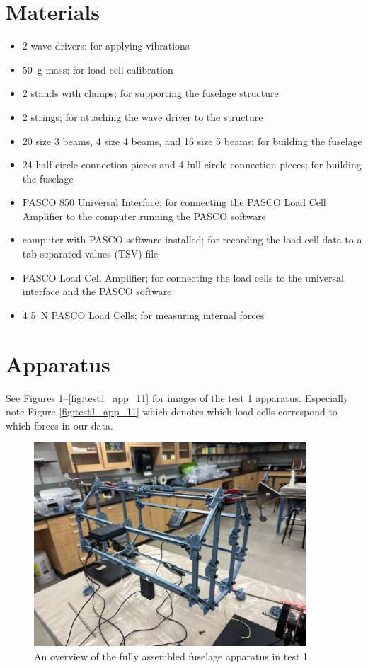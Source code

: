 \documentclass[12 pt]{report}
\begin{document}
\section{Materials} \label{materials}
\begin{itemize}
	\item \num{2} wave drivers; for applying vibrations
	\item \qty{50}{\gram} mass; for load cell calibration
	\item \num{2} stands with clamps; for supporting the fuselage structure
	\item \num{2} strings; for attaching the wave driver to the structure
	\item \num{20} size \num{3} beams, \num{4} size \num{4} beams, and \num{16} size \num{5} beams; for building the fuselage
	\item \num{24} half circle connection pieces and \num{4} full circle connection pieces; for building the fuselage
	\item PASCO 850 Universal Interface; for connecting the PASCO Load Cell Amplifier to the computer running the PASCO software
	\item computer with PASCO software installed; for recording the load cell data to a tab-separated values (TSV) file
	\item PASCO Load Cell Amplifier; for connecting the load cells to the universal interface and the PASCO software
	\item \num{4} \qty{5}{\newton} PASCO Load Cells; for measuring internal forces
\end{itemize}

\section{Apparatus} \label{apparatus}
See Figures \ref{fig:test1_app_1}--\ref{fig:test1_app_11} for images of the test \num{1} apparatus. Especially note Figure \ref{fig:test1_app_11} which denotes which load cells correspond to which forces in our data.

\begin{figure}[htbp]
	\centering
	\includegraphics[width=4in]{images/IMG_1312}
	\caption{An overview of the fully assembled fuselage apparatus in test \num{1}.}
	\label{fig:test1_app_1}
\end{figure}
\end{document}
